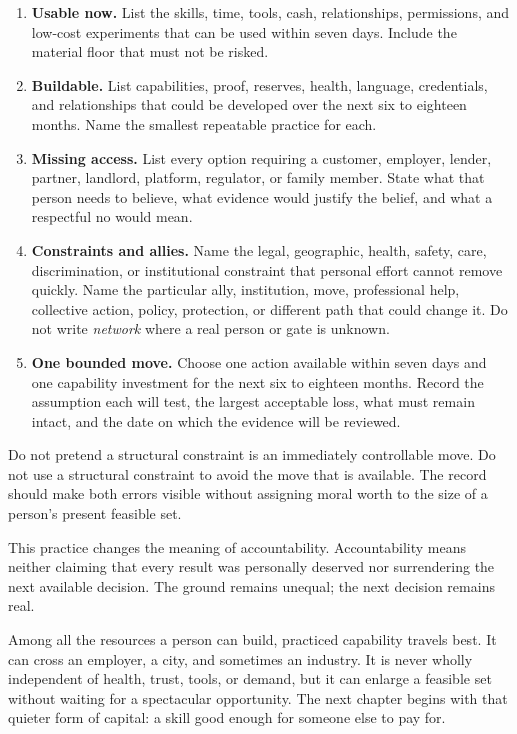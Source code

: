 \begin{enumerate}
\item \textbf{Usable now.} List the skills, time, tools, cash, relationships,
  permissions, and low-cost experiments that can be used within seven days.
  Include the material floor that must not be risked.
\item \textbf{Buildable.} List capabilities, proof, reserves, health, language,
  credentials, and relationships that could be developed over the next six to
  eighteen months. Name the smallest repeatable practice for each.
\item \textbf{Missing access.} List every option requiring a customer,
  employer, lender, partner, landlord, platform, regulator, or family member.
  State what that person needs to believe, what evidence would justify the
  belief, and what a respectful no would mean.
\item \textbf{Constraints and allies.} Name the legal, geographic, health, safety,
  care, discrimination, or institutional constraint that personal effort cannot
  remove quickly. Name the particular ally, institution, move, professional
  help, collective action, policy, protection, or different path that could
  change it. Do not write \emph{network} where a real person or gate is unknown.
\item \textbf{One bounded move.} Choose one action available within seven days
  and one capability investment for the next six to eighteen months. Record
  the assumption each will test, the largest acceptable loss, what must remain
  intact, and the date on which the evidence will be reviewed.
\end{enumerate}

Do not pretend a structural constraint is an immediately controllable move.
Do not use a structural constraint to avoid the move that is available. The
record should make both errors visible without assigning moral worth to the
size of a person's present feasible set.

This practice changes the meaning of accountability. Accountability means
neither claiming that every result was personally deserved nor surrendering
the next available decision. The ground remains unequal; the next decision
remains real.

Among all the resources a person can build, practiced capability travels best.
It can cross an employer, a city, and sometimes an industry. It is never wholly
independent of health, trust, tools, or demand, but it can enlarge a feasible set
without waiting for a spectacular opportunity. The next chapter begins with
that quieter form of capital: a skill good enough for someone else to pay for.
